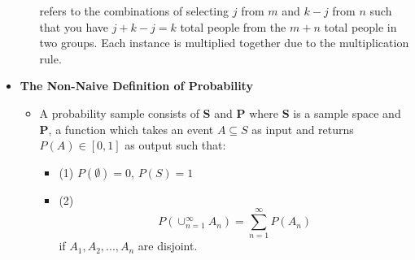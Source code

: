 \documentclass[11pt, oneside]{article}   	%
\begin{document}
\begin{itemize}
\begin{itemize}
			refers to the combinations of selecting $j$ from $m$ and $k-j$ from $n$ such that you have $j + k - j = k$ total people from the $m + n$ total people in two groups. Each instance is multiplied together due to the multiplication rule.
		\end{itemize}
		\item \textbf{The Non-Naive Definition of Probability}
			\begin{itemize}
				\item A probability sample consists of \textbf{S} and \textbf{P} where \textbf{S} is a sample space and \textbf{P}, a function which takes an event $A \subseteq S$ as input and returns $P(A) \in [0, 1]$ as output such that:
				\begin{itemize}
					\item (1) $P(\emptyset) = 0$, $P(S) = 1$
					\item (2) \[P( \cup_{n=1}^{\infty} A_{n} ) = \sum_{n=1}^{\infty} P(A_{n})\] if $A_1, A_2, ..., A_n$ are disjoint.
				\end{itemize}
			\end{itemize}
	\end{itemize}
\end{document}
